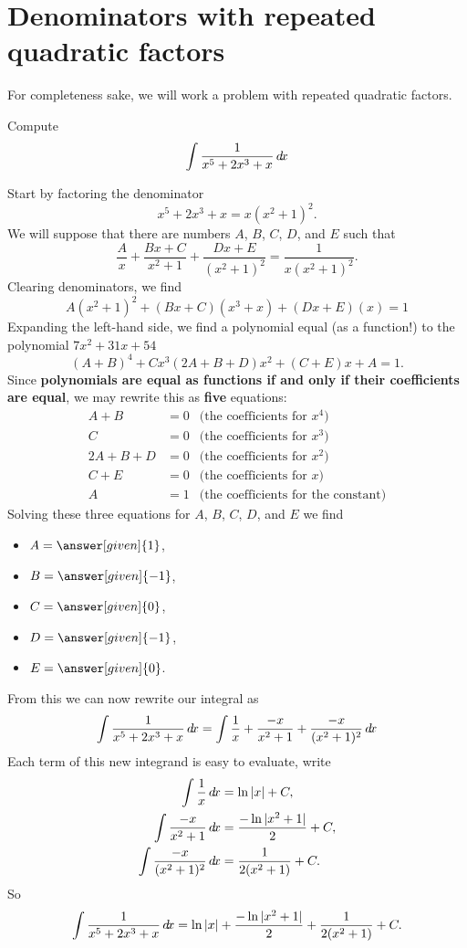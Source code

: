 \documentclass{ximera}
\begin{document}
\section{Denominators with repeated quadratic factors}

For completeness sake, we will work a problem with repeated quadratic factors.

\begin{example}
  Compute
  \[
  \int \frac{1}{x^5 + 2x^3  + x}\mathop{}\!d\! x
  \]
  \begin{explanation}
    Start by factoring the denominator
    \[
    x^5 + 2x^3  + x = x(x^2+1)^2.
    \]
    We will suppose that there are numbers $A$, $B$, $C$, $D$, and $E$
    such that
    \[
    \frac{A}{x} + \frac{Bx+C}{x^2+1} + \frac{Dx+E}{(x^2+1)^2} = \frac{1}{x(x^2+1)^2}.
    \]
    Clearing denominators, we find
    \[
    A(x^2+1)^2 + (Bx+C)(x^3+x)+ (Dx+E)(x) = 1
    \]
    Expanding the left-hand side, we find a polynomial equal (as a
    function!) to the polynomial $7x^2+31x+54$
    \[
    (A+B)^4 +  Cx^3 (2A+B+D)x^2 + (C+E)x + A = 1.
    \]
    Since \textbf{polynomials are equal as functions if and only if
      their coefficients are equal}, we may rewrite this as
    \textbf{five} equations:
    \begin{align*}
      A+B &= 0 &\text{(the coefficients for $x^4$)}\\
      C &= 0 &\text{(the coefficients for $x^3$)}\\
      2A+B+D &= 0 &\text{(the coefficients for $x^2$)}\\
      C+E &= 0 &\text{(the coefficients for $x$)}\\
      A &= 1 &\text{(the coefficients for the constant)}
    \end{align*}
    Solving these three equations for $A$, $B$, $C$, $D$, and $E$ we find
    \begin{itemize}
    \item $A = \answer[given]{1}$,
    \item $B = \answer[given]{-1}$,
    \item $C = \answer[given]{0}$,
    \item $D = \answer[given]{-1}$,
    \item $E = \answer[given]{0}$.
    \end{itemize}
    From this we can now rewrite our integral as
    \[
    \int \frac{1}{x^5 + 2x^3  + x}\mathop{}\!d\! x =\int \frac{1}{x} + \frac{-x}{x^2+1} + \frac{-x}{(x^2+1)^2}\mathop{}\!d\! x
    \]
    Each term of this new integrand is easy to evaluate, write
    \begin{align*}
      \int \frac{1}{x} \mathop{}\!d\! x &= \ln|x| + C,\\
      \int \frac{-x}{x^2+1} \mathop{}\!d\! x &= \frac{-\ln|x^2+1|}{2} +C,\\
      \int \frac{-x}{(x^2+1)^2} \mathop{}\!d\! x &= \frac{1}{2(x^2+1)}+C.
    \end{align*}
    So
    \[
    \int \frac{1}{x^5 + 2x^3  + x}\mathop{}\!d\! x =\ln|x| + \frac{-\ln|x^2+1|}{2} + \frac{1}{2(x^2+1)}+C.
    \]
  \end{explanation}
\end{example}
\end{document}
